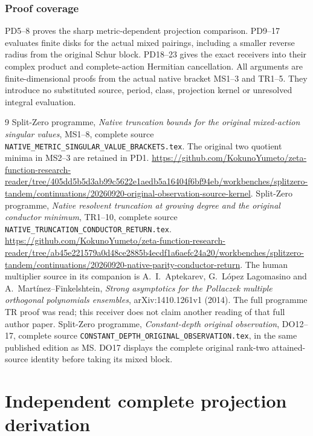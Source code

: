 \documentclass[11pt]{article}
\begin{document}
\section{Proof coverage}
PD5--8 proves the sharp metric-dependent projection comparison.
PD9--17 evaluates finite disks for the actual mixed pairings,
including a smaller reverse radius from the original Schur block.
PD18--23 gives the exact receivers into their complex product and
complete-action Hermitian cancellation.  All arguments are
finite-dimensional proofs from the actual native bracket MS1--3
and TR1--5.  They introduce no substituted source, period, class,
projection kernel or unresolved integral evaluation.
\begin{thebibliography}{9}
 Split-Zero programme,
\emph{Native truncation bounds for the original mixed-action singular values},
MS1--8, complete source \texttt{NATIVE\_METRIC\_SINGULAR\_VALUE\_BRACKETS.tex}.
The original two quotient minima in MS2--3 are retained in PD1.
\url{https://github.com/KokunoYumeto/zeta-function-research-reader/tree/405dd5b5d3ab99c5622e1aedb5a16404f6bf94eb/workbenches/splitzero-tandem/continuations/20260920-original-observation-source-kernel}.
 Split-Zero programme,
\emph{Native resolvent truncation at growing degree and the original conductor minimum},
TR1--10, complete source \texttt{NATIVE\_TRUNCATION\_CONDUCTOR\_RETURN.tex}.
\url{https://github.com/KokunoYumeto/zeta-function-research-reader/tree/ab45e221579a0d48ce2885b4ecdf1a6aefc24a20/workbenches/splitzero-tandem/continuations/20260920-native-parity-conductor-return}.
The human multiplier source in its companion is A.~I.~Aptekarev,
G.~L\'opez Lagomasino and A.~Mart\'inez--Finkelshtein,
\emph{Strong asymptotics for the Pollaczek multiple orthogonal polynomials ensembles},
arXiv:1410.1261v1 (2014). The full programme TR proof was read;
this receiver does not claim another reading of that full author paper.
 Split-Zero programme,
\emph{Constant-depth original observation},
DO12--17, complete source \texttt{CONSTANT\_DEPTH\_ORIGINAL\_OBSERVATION.tex},
in the same published edition as MS. DO17 displays the complete original
rank-two attained-source identity before taking its mixed block.
\end{thebibliography}

\endgroup

\clearpage\begingroup
\part*{Independent complete projection derivation}
\newcommand{\mprindC}{\mathbb C}
\newcommand{\mprindim}{\operatorname{im}}
\newcommand{\mprinddiag}{\operatorname{diag}}
\newcommand{\mprindrank}{\operatorname{rank}}
\end{document}
